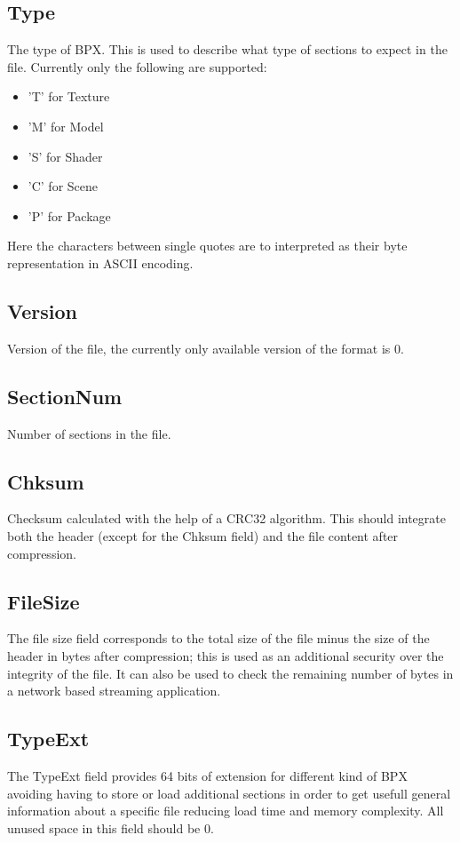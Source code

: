 \subsection{Type}
The type of BPX. This is used to describe what type of sections to expect in the file.\newline
Currently only the following are supported:
\begin{itemize}
    \item 'T' for Texture
    \item 'M' for Model
    \item 'S' for Shader
    \item 'C' for Scene
    \item 'P' for Package
\end{itemize}
Here the characters between single quotes are to interpreted as their byte representation in ASCII encoding.

\subsection{Version}
Version of the file, the currently only available version of the format is 0.

\subsection{SectionNum}
Number of sections in the file.

\subsection{Chksum}
Checksum calculated with the help of a CRC32 algorithm. This should integrate both the header (except for the Chksum field) and the file content after compression.

\subsection{FileSize}
The file size field corresponds to the total size of the file minus the size of the header in bytes after compression; this is used as an additional security over the integrity of the file. It can also be used to check the remaining number of bytes in a network based streaming application.

\subsection{TypeExt}
The TypeExt field provides 64 bits of extension for different kind of BPX avoiding having to store or load additional sections in order to get usefull general information about a specific file reducing load time and memory complexity.\newline
All unused space in this field should be 0.
